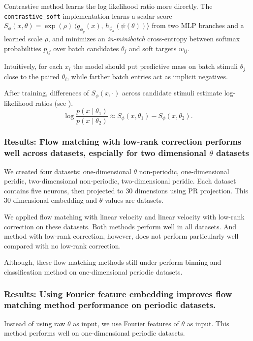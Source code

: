 Contrastive method learns the log likelihood ratio more directly. The \texttt{contrastive\_soft} implementation learns a scalar score $S_\phi(x,\theta)=\exp(\rho)\,\langle g_{\phi_g}(x),\,h_{\phi_h}(\psi(\theta))\rangle$ from two MLP branches and a learned scale $\rho$, and minimizes an \emph{in-minibatch} cross-entropy between softmax probabilities $p_{ij}$ over batch candidates $\theta_j$ and soft targets $w_{ij}$.

Intuitively, for each $x_i$ the model should put predictive mass on batch stimuli $\theta_j$ close to the paired $\theta_i$, while farther batch entries act as implicit negatives.

After training, differences of $S_\phi(x,\cdot)$ across candidate stimuli estimate log-likelihood ratios (see ).
\[
\log \frac{p(x\mid \theta_1)}{p(x\mid \theta_2)}
\approx
S_\phi(x,\theta_1)-S_\phi(x,\theta_2).
\]

\subsubsection{Results: Flow matching with low-rank correction performs well across datasets, espcially for two dimensional $\theta$ datasets}

We created four datasets: one-dimensional $\theta$ non-periodic, one-dimensional peridic, two-dimensional non-periodic, two-dimensional peridic. Each dataset contains five neurons, then projected to 30 dimensions using PR projection. This 30 dimensional embedding and $\theta$ values are datasets.

We applied flow matching with linear velocity and linear velocity with low-rank correction on these datasets. Both methods perform well in all datasets. And method with low-rank correction, however, does not perform particularly well compared with no low-rank correction.

Although, these flow matching methods still under perform binning and classification method on one-dimensional periodic datasets.

\subsubsection{Results: Using Fourier feature embedding improves flow matching method performance on periodic datasets.}

Instead of using raw $\theta$ as input, we use Fourier features of $\theta$ as input. This method performs well on one-dimensional periodic datasets.

